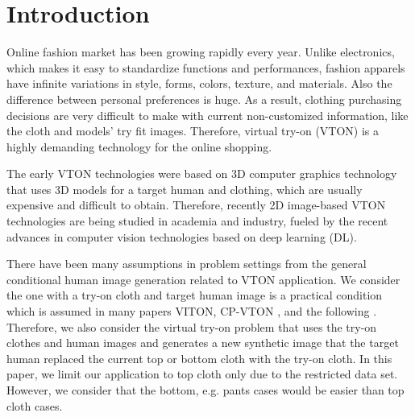 \section{Introduction}


Online fashion market has been growing rapidly every year. Unlike electronics, which makes it easy to standardize functions and performances, fashion apparels have infinite variations in style, forms, colors, texture, and materials.  Also the difference between personal preferences is huge. As a result, clothing purchasing decisions are very difficult to make with current non-customized information, like the cloth and models' try fit images. Therefore, virtual try-on (VTON) is a highly demanding technology for the online shopping. 

The early VTON technologies were based on 3D computer graphics technology that uses 3D models for a target human and clothing, which are usually expensive and difficult to obtain. Therefore, recently 2D image-based VTON technologies are being studied in academia and industry, fueled by the recent advances in computer vision technologies based on deep learning (DL). 

There have been many assumptions in problem settings from the general conditional human image generation related to VTON application. We consider the one with a try-on cloth and target human image is a practical condition which is assumed in many papers VITON\cite{Han2017VITONAI}, CP-VTON\cite{Wang2018TowardCI} , and the following  \cite{Sun2019ImageBasedVT,Yu_2019_ICCV}. Therefore, we also consider the virtual try-on problem that uses the try-on clothes and human images and generates a new synthetic image that the target human replaced the current top or bottom cloth with the try-on cloth. In this paper, we limit our application to top cloth only due to the restricted data set. However, we consider that the bottom, e.g. pants cases would be easier than top cloth cases.

